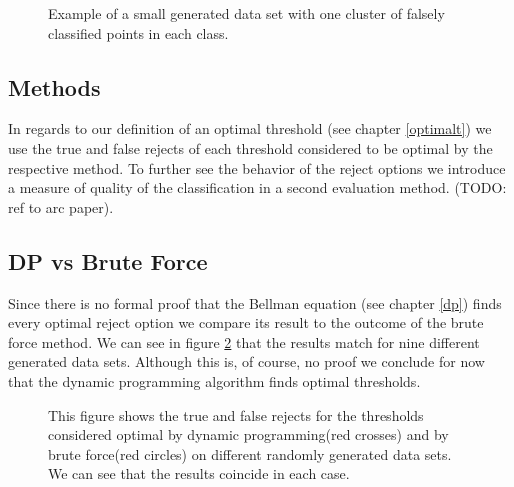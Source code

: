 \begin{figure}[!htbp]
\centering
\caption{Example of a small generated data set with one cluster of falsely classified points in each class.}
\label{dataset}
\end{figure}

\subsection{Methods}
In regards to our definition of an optimal threshold (see chapter \ref{optimalt}) we use the true and false rejects of each threshold considered to be optimal by the respective method. To further see the behavior of the reject options we introduce a measure of quality of the classification in a second evaluation method. (TODO: ref to arc paper).


\subsection{DP vs Brute Force}
\label{DPvsBF}
Since there is no formal proof that the Bellman equation (see chapter \ref{dp}) finds every optimal reject option we compare its result to the outcome of the brute force method. We can see in figure \ref{dpEvaPareto} that the results match for nine different generated data sets. Although this is, of course, no proof we conclude for now that the dynamic programming algorithm finds optimal thresholds.

\begin{figure}[!htbp]
\centering
\caption{This figure shows the true and false rejects for the thresholds considered optimal by dynamic programming(red crosses) and by brute force(red circles) on different randomly generated data sets. We can see that the results coincide in each case. }
\label{dpEvaPareto}
\end{figure}

